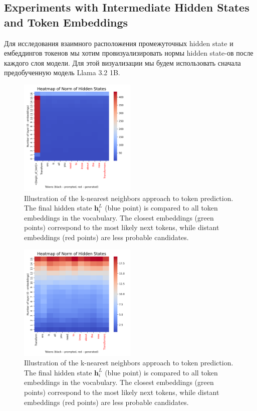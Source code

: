 \subsection{Experiments with Intermediate Hidden States and Token Embeddings}

Для исследования взаимного расположения промежуточных hidden state и ембеддингов токенов мы хотим провизуализировать нормы hidden state-ов после каждого слоя модели. Для этой визуализации мы будем использовать сначала предобученную модель Llama 3.2 1B.

\begin{figure}[h]
    \centering
    \includegraphics[width=0.5\textwidth]{images/heatmap_1b_full.png}
    \caption{Illustration of the k-nearest neighbors approach to token prediction. The final hidden state $\mathbf{h}_i^L$ (blue point) is compared to all token embeddings in the vocabulary. The closest embeddings (green points) correspond to the most likely next tokens, while distant embeddings (red points) are less probable candidates.}
    \label{fig:heatmap_1b_full}
\end{figure}

\begin{figure}[h]
    \centering
    \includegraphics[width=0.5\textwidth]{images/heatmap_1b_notfull.png}
    \caption{Illustration of the k-nearest neighbors approach to token prediction. The final hidden state $\mathbf{h}_i^L$ (blue point) is compared to all token embeddings in the vocabulary. The closest embeddings (green points) correspond to the most likely next tokens, while distant embeddings (red points) are less probable candidates.}
    \label{fig:heatmap_1b_notfull}
\end{figure}


